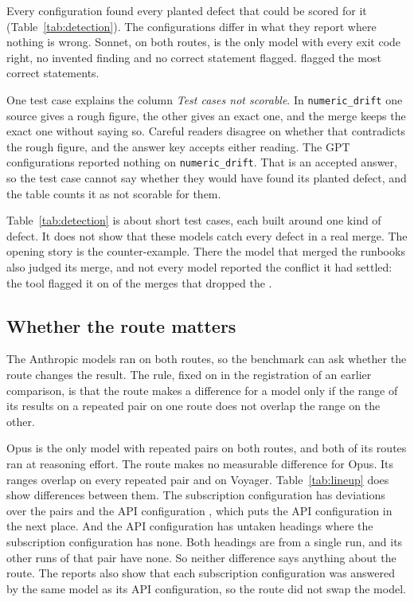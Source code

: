Every configuration found every planted defect that could be scored for it (Table~\ref{tab:detection}). The configurations differ in what they report where nothing is wrong. Sonnet, on both routes, is the only model with every exit code right, no invented finding and no correct statement flagged. \texttt{} flagged the most correct statements.

One test case explains the column \emph{Test cases not scorable}. In \texttt{numeric\_drift} one source gives a rough figure, the other gives an exact one, and the merge keeps the exact one without saying so. Careful readers disagree on whether that contradicts the rough figure, and the answer key accepts either reading. The GPT configurations reported nothing on \texttt{numeric\_drift}. That is an accepted answer, so the test case cannot say whether they would have found its planted defect, and the table counts it as not scorable for them.

Table~\ref{tab:detection} is about short test cases, each built around one kind of defect. It does not show that these models catch every defect in a real merge. The opening story is the counter-example. There the model that merged the runbooks also judged its merge, and not every model reported the conflict it had settled: the tool flagged it on  of the  merges that dropped the .

\subsection{Whether the route matters}
\label{sec:routes}

The Anthropic models ran on both routes, so the benchmark can ask whether the route changes the result. The rule, fixed on  in the registration of an earlier comparison, is that the route makes a difference for a model only if the range of its results on a repeated pair on one route does not overlap the range on the other.

Opus is the only model with repeated pairs on both routes, and both of its routes ran at \texttt{} reasoning effort. The route makes no measurable difference for Opus. Its ranges overlap on every repeated pair and on Voyager. Table~\ref{tab:lineup} does show differences between them. The subscription configuration has  deviations over the  pairs and the API configuration , which puts the API configuration in the next place. And the API configuration has  untaken headings where the subscription configuration has none. Both headings are from a single run, and its other runs of that pair have none. So neither difference says anything about the route. The reports also show that each subscription configuration was answered by the same model as its API configuration, so the route did not swap the model.

